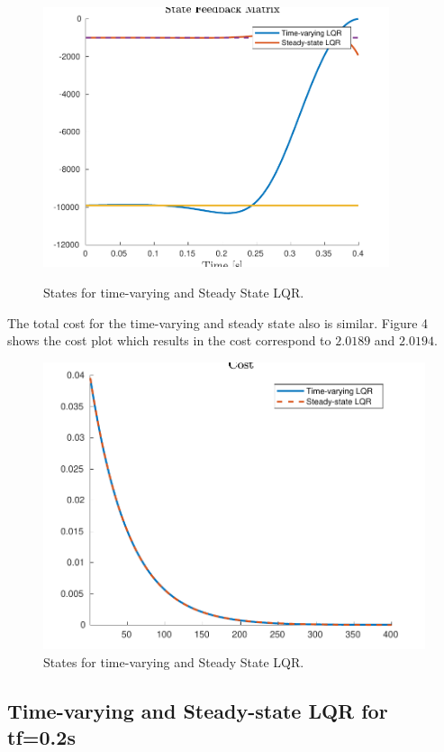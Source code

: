 \documentclass{article}
\begin{document}
\begin{figure}[H] 
\centering
\includegraphics [width=4in]{gain1} \label{gain1}
\caption{States for time-varying and Steady State LQR.}
\end{figure}

\pagebreak
The total cost for the time-varying and steady state also is similar. Figure 4 shows the cost plot which results in the cost correspond to $2.0189$ and $2.0194$.

\begin{figure}[H]
\centering
\includegraphics [width=4.5in]{cost1}
\caption{States for time-varying and Steady State LQR.}
\end{figure}



\subsection*{Time-varying and Steady-state LQR for tf=0.2s}
\end{document}
